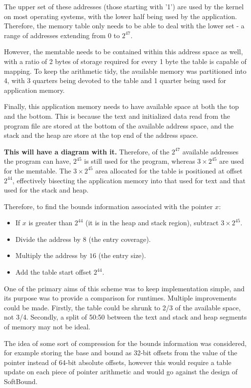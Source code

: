 The upper set of these addresses (those starting with '1') are used by the kernel on most operating systems, with the lower half being used by the application.
Therefore, the memory table only needs to be able to deal with the lower set - a range of addresses extending from $0$ to $2^{47}$.

However, the memtable needs to be contained within this address space as well, with a ratio of 2 bytes of storage required for every 1 byte the table is capable of mapping.
To keep the arithmetic tidy, the available memory was partitioned into 4, with 3 quarters being devoted to the table and 1 quarter being used for application memory.

Finally, this application memory needs to have available space at both the top and the bottom.
This is because the text and initialized data read from the program file are stored at the bottom of the available address space, and the stack and the heap are store at the top end of the address space.

\textbf{This will have a diagram with it.} Therefore, of the $2^{47}$ available addresses the program can have, $2^{45}$ is still used for the program, whereas $3\times 2^{45}$ are used for the memtable.
The $3\times 2^{45}$ area allocated for the table is positioned at offset $2^{44}$, effectively bisecting the application memory into that used for text and that used for the stack and heap.

Therefore, to find the bounds information associated with the pointer $x$:

\begin{itemize}
\item If $x$ is greater than $2^{44}$ (it is in the heap and stack region), subtract $3\times 2^{45}$.
\item Divide the address by $8$ (the entry coverage).
\item Multiply the address by $16$ (the entry size).
\item Add the table start offset $2^{44}$.
\end{itemize}

One of the primary aims of this scheme was to keep implementation simple, and its purpose was to provide a comparison for runtimes.
Multiple improvements could be made.
Firstly, the table could be shrunk to 2/3 of the available space, not 3/4.
Secondly, a split of 50:50 between the text and stack and heap segments of memory may not be ideal.

The idea of some sort of compression for the bounds information was considered, for example storing the base and bound as 32-bit offsets from the value of the pointer instead of 64-bit absolute offsets, however this would require a table update on each piece of pointer arithmetic and would go against the design of SoftBound.

